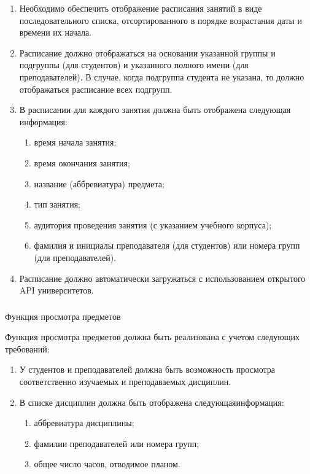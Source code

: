\begin{enumerate}
	\item Необходимо обеспечить отображение расписания занятий в виде последовательного списка, отсортированного в порядке возрастания даты и времени их начала.
	\item Расписание должно отображаться на основании указанной группы и подгруппы (для студентов) и указанного полного имени (для преподавателей). В случае, когда подгруппа студента не указана, то должно отображаться расписание всех подгрупп.
	\item В расписании для каждого занятия должна быть отображена следующая информация:
	\begin{enumerate}
		\item время начала занятия;
		\item время окончания занятия;
		\item название (аббревиатура) предмета;
		\item тип занятия;
		\item аудитория проведения занятия (с указанием учебного корпуса);
		\item фамилия и инициалы преподавателя (для студентов) или номера групп (для преподавателей).
	\end{enumerate}
	\item Расписание должно автоматически загружаться с использованием открытого API университетов.
\end{enumerate}

\subsubsection{} Функция просмотра предметов
\label{sec:domain:specification:subjects}

Функция просмотра предметов должна быть реализована с учетом следующих требований:

\begin{enumerate}
	\item У студентов и преподавателей должна быть возможность просмотра соответственно изучаемых и преподаваемых дисциплин.
	\item В списке дисциплин должна быть отображена следующая\linebreak информация:
	\begin{enumerate}
		\item аббревиатура дисциплины;
		\item фамилии преподавателей или номера групп;
		\item общее число часов, отводимое планом.
	\end{enumerate}
\end{enumerate}

